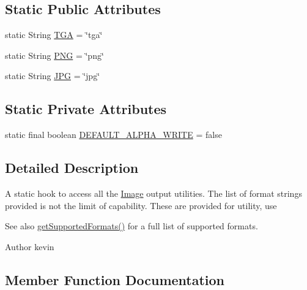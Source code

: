 \subsection*{Static Public Attributes}
\begin{DoxyCompactItemize}
\item 
static String \mbox{\hyperlink{classorg_1_1newdawn_1_1slick_1_1imageout_1_1_image_out_a099a7b974713f1bcf93e186e501d4a71}{T\+GA}} = \char`\"{}tga\char`\"{}
\item 
static String \mbox{\hyperlink{classorg_1_1newdawn_1_1slick_1_1imageout_1_1_image_out_a7fb9f32ed48aaf7f75eb914a65a0f086}{P\+NG}} = \char`\"{}png\char`\"{}
\item 
static String \mbox{\hyperlink{classorg_1_1newdawn_1_1slick_1_1imageout_1_1_image_out_af340492a2d2cc6dcfc3701657f613e45}{J\+PG}} = \char`\"{}jpg\char`\"{}
\end{DoxyCompactItemize}
\subsection*{Static Private Attributes}
\begin{DoxyCompactItemize}
\item 
static final boolean \mbox{\hyperlink{classorg_1_1newdawn_1_1slick_1_1imageout_1_1_image_out_a914d905541d22894588097301e2fc5fb}{D\+E\+F\+A\+U\+L\+T\+\_\+\+A\+L\+P\+H\+A\+\_\+\+W\+R\+I\+TE}} = false
\end{DoxyCompactItemize}


\subsection{Detailed Description}
A static hook to access all the \mbox{\hyperlink{classorg_1_1newdawn_1_1slick_1_1_image}{Image}} output utilities. The list of format strings provided is not the limit of capability. These are provided for utility, use \begin{DoxySeeAlso}{See also}
\mbox{\hyperlink{classorg_1_1newdawn_1_1slick_1_1imageout_1_1_image_out_a5f0e565089362d9df4c3cf11c6f52445}{get\+Supported\+Formats()}} for a full list of supported formats.
\end{DoxySeeAlso}
\begin{DoxyAuthor}{Author}
kevin 
\end{DoxyAuthor}


\subsection{Member Function Documentation}
\mbox{\label{classorg_1_1newdawn_1_1slick_1_1imageout_1_1_image_out_a5f0e565089362d9df4c3cf11c6f52445}} 

